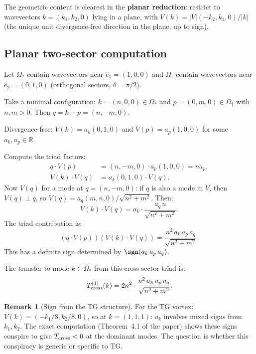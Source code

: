\documentclass[11pt]{article}
\theoremstyle{definition}
\newtheorem{remark}[theorem]{Remark}
\newcommand{\R}{\mathbb{R}}
\begin{document}
The geometric content is clearest in the
\textbf{planar reduction}: restrict to
wavevectors $k = (k_1, k_2, 0)$ lying in
a plane, with $V(k) = |V|(- k_2, k_1, 0)/|k|$
(the unique unit divergence-free direction
in the plane, up to sign).


\subsection{Planar two-sector computation}

Let $\Omega_*$ contain wavevectors near
$\hat e_1 = (1,0,0)$ and $\Omega_\dagger$
contain wavevectors near $\hat e_2 = (0,1,0)$
(orthogonal sectors, $\theta=\pi/2$).

Take a minimal configuration:
$k = (n,0,0)\in\Omega_*$ and
$p = (0,m,0)\in\Omega_\dagger$ with $n,m>0$.
Then $q = k-p = (n,-m,0)$.

Divergence-free:
$V(k) = a_k(0,1,0)$ and
$V(p) = a_p(1,0,0)$ for some $a_k, a_p\in\R$.

Compute the triad factors:
\begin{align}
q\cdot V(p) &= (n,-m,0)\cdot a_p(1,0,0) = na_p,\\
V(k)\cdot V(q) &= a_k(0,1,0)\cdot V(q).
\end{align}
Now $V(q)$ for a mode at $q=(n,-m,0)$:
if $q$ is also a mode in $V$, then
$V(q)\perp q$, so
$V(q) = a_q(m,n,0)/\sqrt{n^2+m^2}$.
Then:
\begin{equation}
V(k)\cdot V(q) = a_k\cdot\frac{a_q\,n}
{\sqrt{n^2+m^2}}.
\end{equation}
The triad contribution is:
\begin{equation}\label{eq:planar-triad}
(q\cdot V(p))(V(k)\cdot V(q))
= \frac{n^2\,a_k\,a_p\,a_q}{\sqrt{n^2+m^2}}.
\end{equation}
This has a definite sign determined by
$\sgn(a_k\,a_p\,a_q)$.

The transfer to mode $k\in\Omega_*$ from
this cross-sector triad is:
\begin{equation}
T^{(1)}_{\rm cross}(k) = 2n^2\cdot
\frac{n^2\,a_k\,a_p\,a_q}{\sqrt{n^2+m^2}}.
\end{equation}

\begin{remark}[Sign from the TG structure]
For the TG vortex: $V(k)=(-k_1/8, k_2/8, 0)$,
so at $k=(1,1,1)$: $a_k$ involves mixed signs
from $k_1, k_2$.  The exact computation
(Theorem~4.1 of the paper) shows these signs
conspire to give $T_{\rm cross}<0$ at the
dominant modes.  The question is whether this
conspiracy is generic or specific to TG.
\end{remark}
\end{document}
